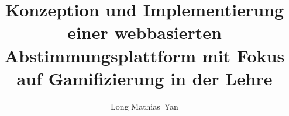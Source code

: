 \documentclass[bachelor,german]{hgbthesis}
\begin{document}

\title{Konzeption und Implementierung einer webbasierten Abstimmungsplattform mit Fokus auf Gamifizierung in der Lehre}
\author{Long Mathias\ Yan}



\frontmatter
\maketitle
\tableofcontents
	


\mainmatter         %











\appendix



%
\end{document}
